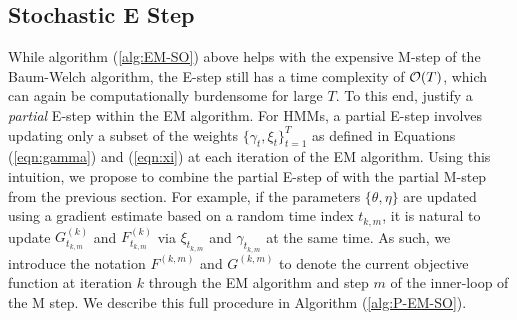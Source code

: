 

\subsection{Stochastic E Step}
\label{subsec:stoch_E}

While algorithm (\ref{alg:EM-SO}) above helps with the expensive M-step of the Baum-Welch algorithm, the E-step still has a time complexity of $\mathcal{O}(T)$, which can again be computationally burdensome for large $T$. 
To this end, \citet{Neal:1998} justify a \textit{partial} E-step within the EM algorithm. For HMMs, a partial E-step involves updating only a subset of the weights $\{\gamma_t,\xi_t\}_{t=1}^T$ as defined in Equations (\ref{eqn:gamma}) and (\ref{eqn:xi}) at each iteration of the EM algorithm. 
Using this intuition, we propose to combine the partial E-step of \citet{Neal:1998} with the partial M-step from the previous section. For example, if the parameters $\{\theta, \eta\}$ are updated using a gradient estimate based on a random time index $t_{k,m}$, it is natural to update $G_{t_{k,m}}^{(k)}$ and $F_{t_{k,m}}^{(k)}$ via $\xi_{t_{k,m}}$ and $\gamma_{t_{k,m}}$ at the same time. As such, we introduce the notation $F^{(k,m)}$ and $G^{(k,m)}$ to denote the current objective function at iteration $k$ through the EM algorithm and step $m$ of the inner-loop of the M step. We describe this full procedure in Algorithm (\ref{alg:P-EM-SO}).


